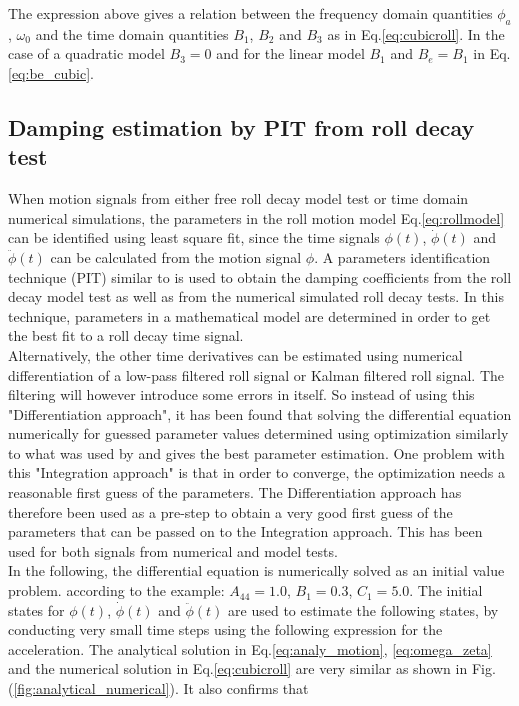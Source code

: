 The expression above gives a relation between the frequency domain quantities $\phi_a$, $\omega_0$ and the time domain quantities $B_1$, $B_2$ and $B_3$ as in Eq.\eqref{eq:cubicroll}. In the case of a quadratic model $B_3=0$ and for the linear model $B_1$ and $B_e=B_1$ in Eq.\eqref{eq:be_cubic}.

\subsection*{Damping estimation by PIT from roll decay test} \label{subsec:damping_estimation}
When motion signals from either free roll decay model test or time domain numerical simulations, the parameters in the roll motion model Eq.\eqref{eq:rollmodel} can be identified using least square fit, since the time signals $\phi(t)$, $\dot{\phi}(t)$ and $\ddot{\phi}(t)$ can be calculated from the motion signal $\phi$. A parameters identification technique (PIT) similar to \cite{7505983/EXYJELCU} is used to obtain the damping coefficients from the roll decay model test as well as from the numerical simulated roll decay tests. In this technique, parameters in a mathematical model are determined in order to get the best fit to a roll decay time signal. \\


Alternatively, the other time derivatives can be estimated using numerical differentiation of a low-pass filtered roll signal or Kalman filtered roll signal. The filtering will however introduce some errors in itself. So instead of using this "Differentiation approach", it has been found that solving the differential equation numerically for guessed parameter values determined using optimization similarly to what was used by \cite{7505983/FJHQJJUH} and \cite{7505983/24TNAV5Z} gives the best parameter estimation. One problem with this "Integration approach" is that in order to converge, the optimization needs a reasonable first guess of the parameters. The Differentiation approach has therefore been used as a pre-step to obtain a very good first guess of the parameters that can be passed on to the Integration approach. This has been used for both signals from numerical and model tests.\\


In the following, the differential equation is numerically solved as an initial value problem. according to the example: $A_{44} = 1.0$, $B_1 = 0.3$, $C_1 = 5.0$. The initial states for $\phi(t)$, $\dot{\phi}(t)$ and $\ddot{\phi}(t)$ are used to estimate the following states, by
conducting very small time steps using the following expression for the acceleration. The analytical solution in Eq.\eqref{eq:analy_motion}, \eqref{eq:omega_zeta} and the numerical solution in Eq.\eqref{eq:cubicroll} are very similar as shown in Fig.(\ref{fig:analytical_numerical}). It also confirms that 

